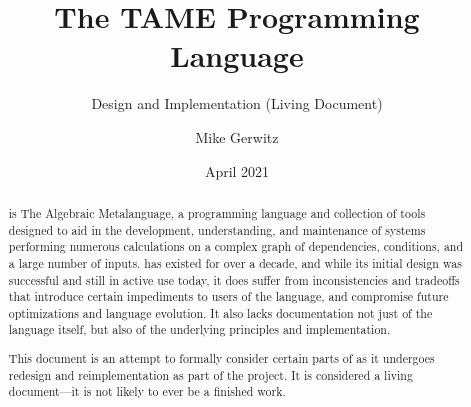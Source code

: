 \documentclass[draft,toc=index]{scrartcl}
\title{The TAME Programming Language}
\subtitle{Design and Implementation (Living Document)}
\author{Mike Gerwitz}
\date{April 2021}%
\begin{document}
\maketitle

\begin{abstract}
  \tame{} is The Algebraic Metalanguage, a programming language and
  collection of tools designed to aid in the development, understanding,
  and maintenance of systems performing numerous calculations on a
  complex graph of dependencies, conditions, and a large number of
  inputs.  \tame{} has existed for over a decade, and while its initial
  design was successful and still in active use today, it does suffer
  from inconsistencies and tradeoffs that introduce certain impediments
  to users of the language, and compromise future optimizations and
  language evolution.  It also lacks documentation not just of the
  language itself, but also of the underlying principles and
  implementation.

  This document is an attempt to formally consider certain parts of
  \tame{} as it undergoes redesign and reimplementation as part of the
  \tamer{} project.  It is considered a living document---it is not
  likely to ever be a finished work.
\end{abstract}


\tableofcontents





\iftplappendix
 \clearpage
 \appendix
 
\fi

\cfoot[\thepage]{\thepage}
\clearpage
\printindex
\end{document}
